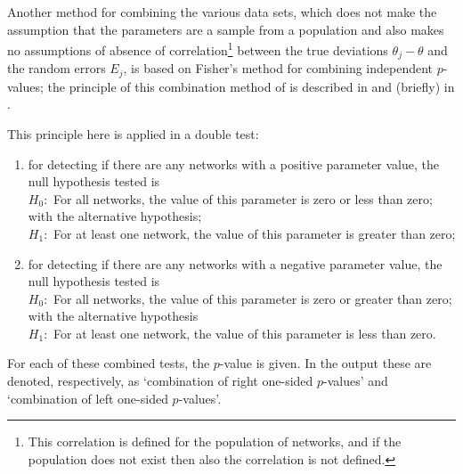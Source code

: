 \documentclass[a4paper,fleqn,11pt]{article}
\newcommand{\+}{\, + \,}
\begin{document}
Another method for combining the various data sets,
which does not make the assumption
that the parameters are a sample from a population and also
makes no assumptions of absence of correlation\footnote{This correlation
is defined for the population of networks, and if the population
does not exist then also the correlation is not defined.}
between the true deviations $\theta_j - \theta$
and the random errors $E_j$,
is based on Fisher's method for combining independent $p$-values;
the principle of this combination method of \citet{Fisher32} is described in
\citet{HedgesOlkin85}    and (briefly) in \citet[Chapter 3]{SnijdersBosker12}.

This principle here is applied in a double test:
\begin{enumerate}
\item for detecting if there are any networks with a positive parameter value,
         the null hypothesis tested is\\
       $H_0 :$   For all networks, the value of this parameter
            is zero or less than zero;\\
            with the alternative hypothesis;\\
        $H_1 :$
             For at least one network, the value of this parameter
             is greater than zero;
\item for detecting if there are any networks with a negative parameter value,
         the null hypothesis tested is\\
            $H_0 :$ For all networks, the value of this parameter
                  is zero or greater than zero;\\
            with the alternative hypothesis\\
            $H_1 :$ For at least one network, the value of this parameter
                   is less than zero.
\end{enumerate}
      For each of these combined tests, the $p$-value is given.
      In the output these are denoted, respectively,
      as `combination of right one-sided $p$-values' and
      `combination of left one-sided $p$-values'.
\end{document}
